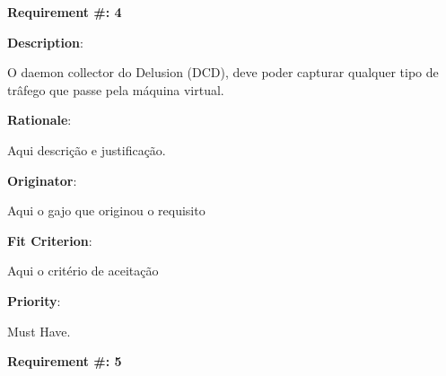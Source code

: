 \pagebreak







\begin{minipage}{0.55\textwidth}
\begin{flushleft}\textbf{Requirement \#: 4}\end{flushleft}
\end{minipage}
\begin{minipage}{0.4\textwidth}
\end{minipage}

\begin{description}
\item \textbf{Description}:

O daemon collector do Delusion (DCD), deve poder capturar qualquer tipo de trâfego que passe pela máquina virtual.

\item \textbf{Rationale}:

Aqui descrição e justificação. \\
\item \textbf{Originator}:

Aqui o gajo que originou o requisito\\

\item \textbf{Fit Criterion}:

Aqui o critério de aceitação \\

\item \textbf{Priority}:

Must Have. \\

\end{description}

\pagebreak





\begin{minipage}{0.55\textwidth}
\begin{flushleft}\textbf{Requirement \#: 5}\end{flushleft}
\end{minipage}
\begin{minipage}{0.4\textwidth}
\end{minipage}

